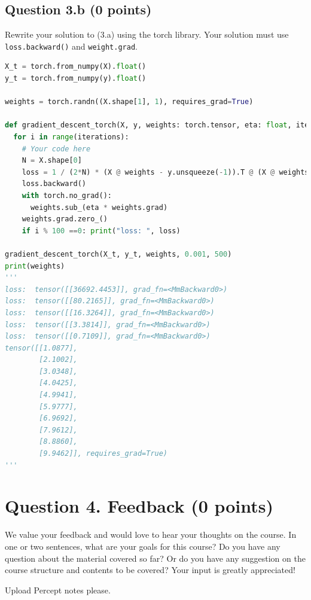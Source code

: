 \documentclass[12pt]{article}
\begin{document}
\subsection*{Question 3.b (0 points) } 
Rewrite your solution to (3.a) using the torch library. Your solution must use \texttt{loss.backward()} and \texttt{weight.grad}.

\begin{solution}
\begin{lstlisting}[language=Python]
X_t = torch.from_numpy(X).float()
y_t = torch.from_numpy(y).float()

weights = torch.randn((X.shape[1], 1), requires_grad=True)

def gradient_descent_torch(X, y, weights: torch.tensor, eta: float, iterations: int) -> None:
  for i in range(iterations):
    # Your code here
    N = X.shape[0]
    loss = 1 / (2*N) * (X @ weights - y.unsqueeze(-1)).T @ (X @ weights - y.unsqueeze(-1))
    loss.backward()
    with torch.no_grad(): 
      weights.sub_(eta * weights.grad)
    weights.grad.zero_()
    if i % 100 ==0: print("loss: ", loss) 

gradient_descent_torch(X_t, y_t, weights, 0.001, 500)
print(weights)
'''
loss:  tensor([[36692.4453]], grad_fn=<MmBackward0>)
loss:  tensor([[80.2165]], grad_fn=<MmBackward0>)
loss:  tensor([[16.3264]], grad_fn=<MmBackward0>)
loss:  tensor([[3.3814]], grad_fn=<MmBackward0>)
loss:  tensor([[0.7109]], grad_fn=<MmBackward0>)
tensor([[1.0877],
        [2.1002],
        [3.0348],
        [4.0425],
        [4.9941],
        [5.9777],
        [6.9692],
        [7.9612],
        [8.8860],
        [9.9462]], requires_grad=True)
'''
\end{lstlisting}
\end{solution}

\section*{Question 4. Feedback (0 points)}
We value your feedback and would love to hear your thoughts on the course. In one or two sentences, what are your goals for this course? Do you have any question about the material covered so far? Or do you have any suggestion on the course structure and contents to be covered? Your input is greatly appreciated!

\begin{solution}
Upload Percept notes please.
\end{solution}

\newpage
\end{document}
